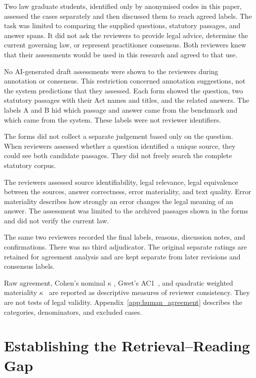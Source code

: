 \documentclass[pdflatex,sn-basic]{sn-jnl}%
\theoremstyle{thmstyleone}%
\theoremstyle{thmstyletwo}%
\theoremstyle{thmstylethree}%
\begin{document}
Two law graduate students, identified only by anonymised codes in this paper,
assessed the cases separately and then discussed them to reach agreed labels.
The task was limited to comparing the supplied questions, statutory passages,
and answer spans. It did not ask the reviewers to provide legal advice,
determine the current governing law, or represent practitioner consensus. Both
reviewers knew that their assessments would be used in this research and agreed
to that use.

No AI-generated draft assessments were shown to the reviewers during
annotation or consensus. This restriction concerned annotation suggestions,
not the system predictions that they assessed. Each form showed the question,
two statutory passages with their Act names and titles, and the related
answers. The labels A and B hid which passage and answer came from the
benchmark and which came from the system. These labels were not reviewer
identifiers.

The forms did not collect a separate judgement based only on the question.
When reviewers assessed whether a question identified a unique source, they
could see both candidate passages. They did not freely search the complete
statutory corpus.

The reviewers assessed source identifiability, legal relevance, legal
equivalence between the sources, answer correctness, error materiality, and
text quality. Error materiality describes how strongly an error changes the
legal meaning of an answer. The assessment was limited to the archived
passages shown in the forms and did not verify the current law.

The same two reviewers recorded the final labels, reasons, discussion notes,
and confirmations. There was no third adjudicator. The original separate
ratings are retained for agreement analysis and are kept separate from later
revisions and consensus labels.

Raw agreement, Cohen's nominal $\kappa$ \citep{cohen1960agreement}, Gwet's
AC1~\citep{gwet2008agreement}, and quadratic weighted materiality
$\kappa$~\citep{cohen1968weighted} are reported as descriptive measures of
reviewer consistency. They are not tests of legal validity.
Appendix~\ref{app:human_agreement} describes the categories, denominators, and
excluded cases.


\FloatBarrier


\section{Establishing the Retrieval--Reading Gap}
\label{sec:results}
\end{document}
